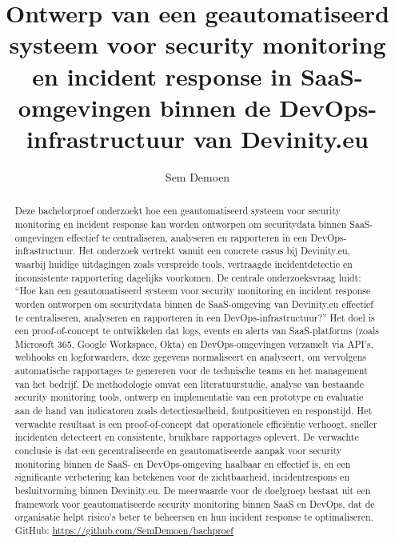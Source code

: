 \documentclass{hogent-article}
\title{Ontwerp van een geautomatiseerd systeem voor security monitoring en incident response in SaaS-omgevingen binnen de DevOps-infrastructuur van Devinity.eu}
\author{Sem Demoen}
\begin{document}
\begin{abstract}
Deze bachelorproef onderzoekt hoe een geautomatiseerd systeem voor security monitoring en incident response kan worden ontworpen om securitydata binnen SaaS-omgevingen effectief te centraliseren, analyseren en rapporteren in een DevOps-infrastructuur.
Het onderzoek vertrekt vanuit een concrete casus bij Devinity.eu, waarbij huidige uitdagingen zoals verspreide tools, vertraagde incidentdetectie en inconsistente rapportering dagelijks voorkomen.
De centrale onderzoeksvraag luidt: ``Hoe kan een geautomatiseerd systeem voor security monitoring en incident response worden ontworpen om securitydata binnen de SaaS-omgeving van Devinity.eu effectief te centraliseren, analyseren en rapporteren in een DevOps-infrastructuur?''
Het doel is een proof-of-concept te ontwikkelen dat logs, events en alerts van SaaS-platforms (zoals Microsoft 365, Google Workspace, Okta) en DevOps-omgevingen verzamelt via API's, webhooks en logforwarders,
deze gegevens normaliseert en analyseert, om vervolgens automatische rapportages te genereren voor de technische teams en het management van het bedrijf.
De methodologie omvat een literatuurstudie, analyse van bestaande security monitoring tools, ontwerp en implementatie van een prototype en evaluatie aan de hand van indicatoren zoals detectiesnelheid, foutpositieven en responstijd.
Het verwachte resultaat is een proof-of-concept dat operationele efficiëntie verhoogt, sneller incidenten detecteert en consistente, bruikbare rapportages oplevert.
De verwachte conclusie is dat een gecentraliseerde en geautomatiseerde aanpak voor security monitoring binnen de SaaS- en DevOps-omgeving haalbaar en effectief is, en een significante verbetering kan betekenen voor de zichtbaarheid, incidentrespons en besluitvorming binnen Devinity.eu.
De meerwaarde voor de doelgroep bestaat uit een framework voor geautomatiseerde security monitoring binnen SaaS en DevOps, dat de organisatie helpt risico's beter te beheersen en hun incident response te optimaliseren. GitHub: \url{https://github.com/SemDemoen/bachproef}
\end{abstract}



\tableofcontents



\printbibliography[heading=bibintoc]
\end{document}
